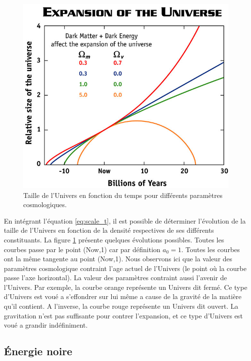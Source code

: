 \begin{figure}[bth]
        \includegraphics[width=.9\linewidth]{img/01/scale_t.jpg} 
        \caption{Taille de l'Univers en fonction du temps pour différents paramètres cosmologiques.
        }
 		\label{fig:scale_t}
\end{figure}

En intégrant l’équation \ref{eq:scale_t}, il est possible de déterminer l'évolution de la taille de l'Univers en fonction de la densité respectives de ses différents constituants.
La figure \ref{fig:scale_t} présente quelques évolutions possibles.
Toutes les courbes passe par le point (Now,1) car par définition $a_0 = 1$.
Toutes les courbes ont la même tangente au point (Now,1).
Nous observons ici que la valeur des paramètres cosmologique contraint l'age actuel de l'Univers (le point où la courbe passe l'axe horizontal).
La valeur des paramètres contraint aussi l'avenir de l'Univers.
Par exemple, la courbe orange représente un Univers dit fermé.
Ce type d'Univers est voué a s'effondrer sur lui même a cause de la gravité de la matière qu'il contient.
A l'inverse, la courbe rouge représente un Univers dit ouvert.
La gravitation n'est pas suffisante pour contrer l'expansion, et ce type d'Univers est voué a grandir indéfiniment.



\subsection{Énergie noire}

